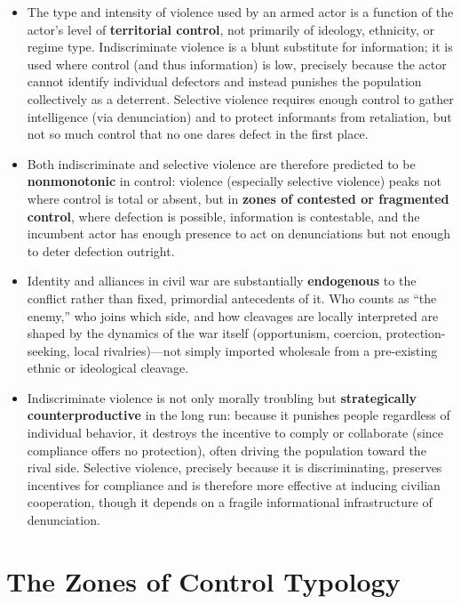 \documentclass[12pt]{article}
\begin{document}
\begin{itemize}[leftmargin=*, itemsep=4pt]
    \item The type and intensity of violence used by an armed actor is a function of the actor's level of \textbf{territorial control}, not primarily of ideology, ethnicity, or regime type. Indiscriminate violence is a blunt substitute for information; it is used where control (and thus information) is low, precisely because the actor cannot identify individual defectors and instead punishes the population collectively as a deterrent. Selective violence requires enough control to gather intelligence (via denunciation) and to protect informants from retaliation, but not so much control that no one dares defect in the first place.
    \item Both indiscriminate and selective violence are therefore predicted to be \textbf{nonmonotonic} in control: violence (especially selective violence) peaks not where control is total or absent, but in \textbf{zones of contested or fragmented control}, where defection is possible, information is contestable, and the incumbent actor has enough presence to act on denunciations but not enough to deter defection outright.
    \item Identity and alliances in civil war are substantially \textbf{endogenous} to the conflict rather than fixed, primordial antecedents of it. Who counts as ``the enemy,'' who joins which side, and how cleavages are locally interpreted are shaped by the dynamics of the war itself (opportunism, coercion, protection-seeking, local rivalries)---not simply imported wholesale from a pre-existing ethnic or ideological cleavage.
    \item Indiscriminate violence is not only morally troubling but \textbf{strategically counterproductive} in the long run: because it punishes people regardless of individual behavior, it destroys the incentive to comply or collaborate (since compliance offers no protection), often driving the population toward the rival side. Selective violence, precisely because it is discriminating, preserves incentives for compliance and is therefore more effective at inducing civilian cooperation, though it depends on a fragile informational infrastructure of denunciation.
\end{itemize}

\section{The Zones of Control Typology}
\end{document}
